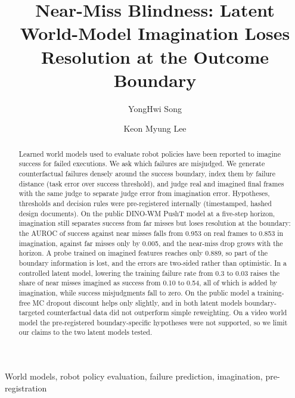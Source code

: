 \documentclass[nouppercase]{kaia}
\title{Near-Miss Blindness: Latent World-Model Imagination Loses Resolution at the Outcome Boundary}
\author{YongHwi Song}{a}
\author{Keon Myung Lee}{b}
\affiliation{School of Information and Communication Engineering, Chungbuk National University, Korea, thddydgnl1937@gmail.com}{a}
\affiliation{School of Software, Chungbuk National University, Korea, kmlee@cbnu.ac.kr}{b}
\begin{document}
\maketitle
\vspace{-34pt}

\begin{mdframed}

\begin{abstract}
Learned world models used to evaluate robot policies have been reported to imagine success for failed executions. We ask which failures are misjudged. We generate counterfactual failures densely around the success boundary, index them by failure distance (task error over success threshold), and judge real and imagined final frames with the same judge to separate judge error from imagination error. Hypotheses, thresholds and decision rules were pre-registered internally (timestamped, hashed design documents). On the public DINO-WM PushT model at a five-step horizon, imagination still separates success from far misses but loses resolution at the boundary: the AUROC of success against near misses falls from 0.953 on real frames to 0.853 in imagination, against far misses only by 0.005, and the near-miss drop grows with the horizon. A probe trained on imagined features reaches only 0.889, so part of the boundary information is lost, and the errors are two-sided rather than optimistic. In a controlled latent model, lowering the training failure rate from 0.3 to 0.03 raises the share of near misses imagined as success from 0.10 to 0.54, all of which is added by imagination, while success misjudgments fall to zero. On the public model a training-free MC dropout discount helps only slightly, and in both latent models boundary-targeted counterfactual data did not outperform simple reweighting. On a video world model the pre-registered boundary-specific hypotheses were not supported, so we limit our claims to the two latent models tested.
\end{abstract}
\begin{keywords}
World models, robot policy evaluation, failure prediction, imagination, pre-registration
\end{keywords}


\end{mdframed}
\end{document}
